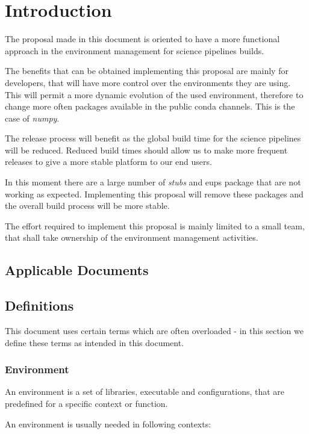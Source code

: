 \section{Introduction} \label{sec:intro}

The proposal made in this document is oriented to have a more functional approach in the environment management for science pipelines builds.

The benefits that can be obtained implementing this proposal are mainly for developers, that will have more control over the environments they are using. 
This will permit a more dynamic evolution of the used environment, therefore to change more often packages available in the public conda channels. This is the case of \textit{numpy}.

The release process will  benefit as the global build time for the science pipelines  will be reduced. 
Reduced build times should allow us to make more frequent releases to give a more stable platform to our end users.

In this moment there are a large number of \textit{stubs} and eups package that are not working as expected.
Implementing this proposal will remove these packages and the overall build process will be more stable.

The effort required to implement this proposal is mainly limited to a small team, that shall take ownership of the environment management activities.


\subsection{Applicable Documents}


\subsection{Definitions}

This document uses certain terms which are often overloaded -  in this section we define these terms  as intended in this document.

\subsubsection{Environment} \label{sec:envdef}

An environment is a set of libraries, executable and configurations, that are predefined for a specific context or function.

An environment is usually needed in following contexts:

